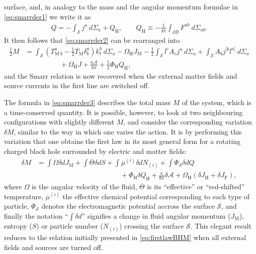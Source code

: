 \documentclass[
twoside,
openright,
frontopenright,
]{dmathesis}
\newcommand{\nn}{\nonumber}
\begin{document}
surface, and, in analogy to the mass and the angular momentum formulae in
\cref{eq:smarrder1} we write it as
\begin{align}
  Q = -\int_\mathcal{S} j^a ~d\Sigma_a + Q_\mathrm{H}, \qquad Q_\mathrm{H} \equiv -\frac{1}{4\pi}\int_{\partial\mathcal{B}}F^{ab} ~ d\Sigma_{ab}.
\end{align}
It then follows that \cref{eq:smarrder2} can be rearranged into
\begin{align}
  \label{eq:smarrder3}
  \frac12 M &= \int_\mathcal{S} \left(T^a_{\mathrm{M}~b} - \frac12 T_\mathrm{M}
  \delta^a_b\right)k_t^b~d\Sigma_a - \Omega_\mathrm{H} J_\mathrm{M} - \frac12
\int_\mathcal{S} l^c A_c j^a~d\Sigma_a + \int_\mathcal{S} A_b j^{[b}l^{a]}~d\Sigma_a \nn\\
&\hspace{5em}+ \Omega_\mathrm{H} J + \frac{\kappa \mathcal{A}}{8\pi} + \frac12
\Phi_\mathrm{H} Q_\mathrm{H},
\end{align}
and the Smarr relation is now recovered when the external matter fields and
source currents in the first line are switched off.

The formula in \cref{eq:smarrder3} describes the total mass $M$ of the system,
which is a time-conserved quantity. It is possible, however, to look at two
neighbouring configurations with slightly different $M$, and consider the
corresponding variation $\delta M$, similar to the way in which one varies the
action. It is by performing this variation that one obtains the first law in its
most general form for a rotating charged black hole surrounded by electric and
matter fields:
\begin{align}
  \label{eq:firstlawder1}
  \delta M &= \int \Omega\delta dJ_\mathrm{M} + \int \overline{\Theta}\delta dS +
  \int \overline{\mu}^{(i)} \delta dN_{(i)} +\int \Phi_\mathcal{S}\delta dQ \nn\\
  &\hspace{12em}+ \Phi_\mathrm{H} \delta
  Q_\mathrm{H} + \frac{\kappa}{8\pi}\delta\mathcal{A} + \Omega_\mathrm{H}(\delta
  J_\mathrm{H}+\delta J_\mathrm{F}),
\end{align}
where $\Omega$ is the angular velocity of the fluid, $\overline{\Theta}$ is its
``effective'' or ``red-shifted'' temperature, $\overline{\mu}^{(i)}$ the
effective chemical potential corresponding to each type of particle,
$\Phi_\mathcal{S}$ denotes the electromagnetic potential accross the surface
$\mathcal{S}$, and finally the notation ``$\int\delta d$'' signifies a change in
fluid angular momentum ($J_\mathrm{M}$), entropy ($S$) or particle number
($N_{(i)}$) crossing the surface $\mathcal{S}$. This elegant result reduces to
the relation initially presented in \cref{eq:firstlawBHM} when all external
fields and sources are turned off.
\end{document}
